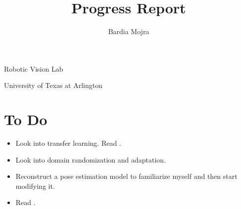 \documentclass[11pt]{article}
\title{Progress Report}
\author{Bardia Mojra}
\begin{document}
\maketitle
\thispagestyle{empty}

\begin{center}
	\bigskip
	\bigskip
	Robotic Vision Lab

	University of Texas at Arlington
\end{center}

\newpage

\section{To Do}
\begin{itemize}
	\item Look into transfer learning. Read \cite{tobin2017domain}.
	\item Look into domain randomization and adaptation.
	\item Reconstruct a pose estimation model to familiarize myself and then start modifying it.
	\item Read \cite{choi2013rgb}.
\end{itemize}
\end{document}
